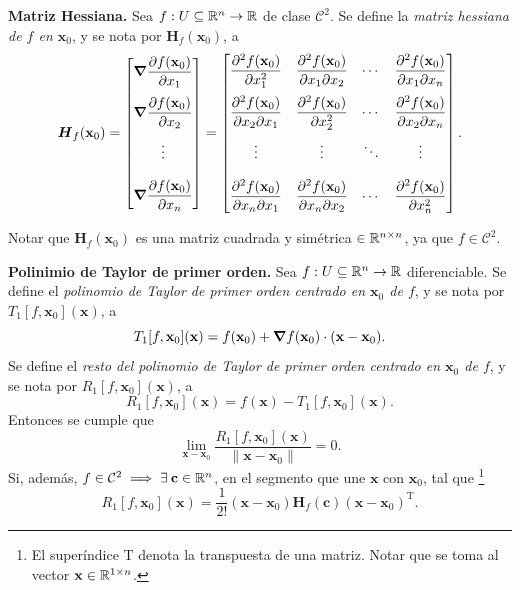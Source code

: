 \label{sec:Taylor}

\begin{definition}\textbf{Matriz Hessiana.}
  Sea $f:U\subseteq\mathbb{R}^n\to\mathbb{R}$ de clase $\mathcal{C}^2$. Se define la \emph{matriz hessiana de $f$ en $\mathbf{x}_0$}, y se nota por $\boldsymbol{H}_f(\mathbf{x}_0)$, a 
  \[
    \boldsymbol{H}_f(\mathbf{x}_0)=
    \begin{bmatrix}
      \grad{\dif{f(\mathbf{x}_0)}{x_1}}\\[.4cm]
      \grad{\dif{f(\mathbf{x}_0)}{x_2}}\\[.4cm]
      \vdotswithin{f}\\[.4cm]
      \grad{\dif{f(\mathbf{x}_0)}{x_n}}
    \end{bmatrix}
    =
    \begin{bmatrix}
      \dfrac{\partial^2 f(\mathbf{x}_0)}{\partial x_1^2} & \dfrac{\partial^2 f(\mathbf{x}_0)}{\partial x_1 \partial x_2} &  \cdots & \dfrac{\partial^2 f(\mathbf{x}_0)}{\partial x_1 \partial x_n} \\[.4cm]
      \dfrac{\partial^2 f(\mathbf{x}_0)}{\partial x_2 \partial x_1} & \dfrac{\partial^2 f(\mathbf{x}_0)}{\partial x_2^2} & \cdots & \dfrac{\partial^2 f(\mathbf{x}_0)}{\partial x_2 \partial x_n} \\[.4cm]
      \vdots & \vdots & \ddots & \vdots \\[.4cm]
      \dfrac{\partial^2 f(\mathbf{x}_0)}{\partial x_n \partial x_1} & \dfrac{\partial^2 f(\mathbf{x}_0)}{\partial x_n \partial x_2} & \cdots & \dfrac{\partial^2 f(\mathbf{x}_0)}{\partial x_n^2}
    \end{bmatrix}.
\]
\end{definition}

\begin{obs}
Notar que $\boldsymbol{H}_f(\mathbf{x}_0)$ es una matriz cuadrada y sim\'etrica $\in \mathbb{R}^{n\times n}$, ya que $f\in\mathcal{C}^2$.
\end{obs}

\begin{theorem}\label{tayloro2.1} \textbf{Polinimio de Taylor de primer orden.}  Sea $f:U\subseteq\mathbb{R}^n\to\mathbb{R}$  diferenciable. Se define el \emph{polinomio de Taylor de primer orden centrado en $\mathbf{x}_0$ de $f$}, y se nota por $T_1[f,\mathbf{x}_0](\mathbf{x})$, a
  \[
    T_1[f,\mathbf{x}_0](\mathbf{x})=f(\mathbf{x}_0)+\grad{f}(\mathbf{x}_0)\cdot(\mathbf{x-x}_0).
  \]
  Se define el \emph{resto del polinomio de Taylor de primer orden centrado en $\mathbf{x}_0$ de $f$}, y se nota por $R_1[f,\mathbf{x}_0](\mathbf{x})$, a
  \[
    R_1[f,\mathbf{x}_0](\mathbf{x})=f(\mathbf{x})-T_1[f,\mathbf{x}_0](\mathbf{x}).
  \]
  Entonces se cumple que
  \[
    \lim_{\mathbf{x-x}_0}\dfrac{R_1[f,\mathbf{x}_0](\mathbf{x})}{\|\mathbf{x-x}_0\|}=0.
  \]
  Si, adem\'as, $f\in\mathcal{C}^2\implies\exists\:\mathbf{c}\in\mathbb{R}^n$, en el segmento que une $\mathbf{x}$ con $\mathbf{x}_0$, tal que \footnote{El super\'indice T denota la transpuesta de una matriz. Notar que se toma al vector $\mathbf{x}\in\mathbb{R}^{1\times n}$.}
  \[
    R_1[f,\mathbf{x}_0](\mathbf{x})=\frac{1}{2!}(\mathbf{x-x}_0)\boldsymbol{H}_f(\mathbf{c})(\mathbf{x-x}_0)^\text{T}.
  \]
\end{theorem}

